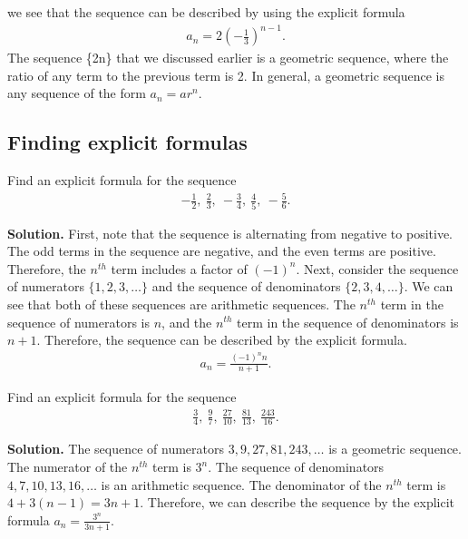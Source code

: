 \documentclass{report}
\begin{document}
    we see that the sequence can be described by using the explicit formula
    \begin{align*}
        a_{n} = 2\left(-\frac{1}{3}\right)^{n-1}
    .\end{align*}
    The sequence \{2n\} that we discussed earlier is a geometric sequence, where the ratio of any term to the previous term is 2. In general, a geometric sequence is any sequence of the form $a_{n} = ar^{n} $.
    \pagebreak 
    \subsection*{Finding explicit formulas}
    \bigbreak \noindent 
    \begin{eg}
       Find an explicit formula for the sequence 
       \begin{align*}
           -\frac{1}{2},\ \frac{2}{3},\ -\frac{3}{4},\ \frac{4}{5},\ -\frac{5}{6}
       .\end{align*}
    \end{eg}
    \bigbreak \noindent 
    \textbf{Solution.}
    First, note that the sequence is alternating from negative to positive. The odd terms in the sequence are negative, and the even terms are positive. Therefore, the \( n^{th} \) term includes a factor of \( (-1)^n \). Next, consider the sequence of numerators \( \{1,2,3,\ldots\} \) and the sequence of denominators \( \{2,3,4,\ldots\} \). We can see that both of these sequences are arithmetic sequences. The \( n^{th} \) term in the sequence of numerators is \( n \), and the \( n^{th} \) term in the sequence of denominators is \( n+1 \). Therefore, the sequence can be described by the explicit formula.
    \begin{align*}
        a_{n} = \frac{(-1)^{n}n}{n+1}
    .\end{align*}

    \bigbreak \noindent 
    \begin{eg}
       Find an explicit formula for the sequence
       \begin{align*}
           \frac{3}{4},\ \frac{9}{7},\ \frac{27}{10},\ \frac{81}{13},\ \frac{243}{16}
       .\end{align*}
    \end{eg}
    \bigbreak \noindent 
    \textbf{Solution.}
    The sequence of numerators \(3,9,27,81,243,\ldots\) is a geometric sequence. The numerator of the \(n^{th}\) term is \(3^n\). The sequence of denominators \(4,7,10,13,16,\ldots\) is an arithmetic sequence. The denominator of the \(n^{th}\) term is \(4+3(n-1) = 3n+1\). Therefore, we can describe the sequence by the explicit formula \(a_n = \frac{3^n}{3n+1}\).
\end{document}
